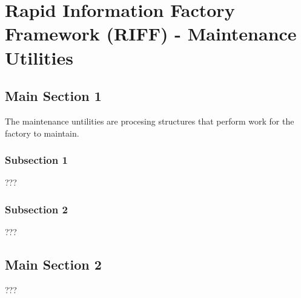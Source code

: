 
\chapter{Rapid Information Factory Framework (RIFF) - Maintenance Utilities} %

\label{Chapter38} %



\section{Main Section 1}

The maintenance untilities are procesing structures that perform work for the factory to maintain.

\subsection{Subsection 1}

???


\subsection{Subsection 2}

???


\section{Main Section 2}

???
